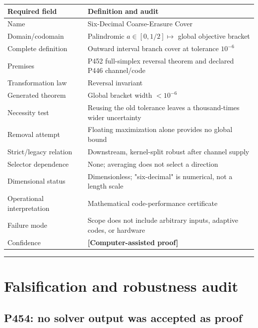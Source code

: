 \documentclass[11pt,a4paper,openany]{report}
\begin{document}
\begin{center}
\begingroup\small
\setlength{\tabcolsep}{2.5pt}
\renewcommand{\arraystretch}{1.16}
\begin{longtable}{@{}p{}p{}@{}}
\toprule
\textbf{Required field} & \textbf{Definition and audit} \\
\midrule
\endhead
Name & Six-Decimal Coarse-Erasure Cover \\
Domain/\allowbreak{}codomain & Palindromic \(a\in[0,1/2]\mapsto\) global objective bracket \\
Complete definition & Outward interval branch cover at tolerance \(10^{-6}\) \\
Premises & P452 full-simplex reversal theorem and declared P446 channel/\allowbreak{}code \\
Transformation law & Reversal invariant \\
Generated theorem & Global bracket width \(<10^{-6}\) \\
Necessity test & Reusing the old tolerance leaves a thousand-times wider uncertainty \\
Removal attempt & Floating maximization alone provides no global bound \\
Strict/\allowbreak{}legacy relation & Downstream, kernel-split robust after channel supply \\
Selector dependence & None; averaging does not select a direction \\
Dimensional status & Dimensionless; "six-decimal" is numerical, not a length scale \\
Operational interpretation & Mathematical code-performance certificate \\
Failure mode & Scope does not include arbitrary inputs, adaptive codes, or hardware \\
Confidence & \textbf{\textcolor{fingreen}{[Computer-assisted proof]}} \\
\bottomrule
\end{longtable}
\endgroup
\end{center}

\par\medskip\hrule\medskip

\chapter{Falsification and robustness audit}

\section{P454: no solver output was accepted as proof}
\end{document}
